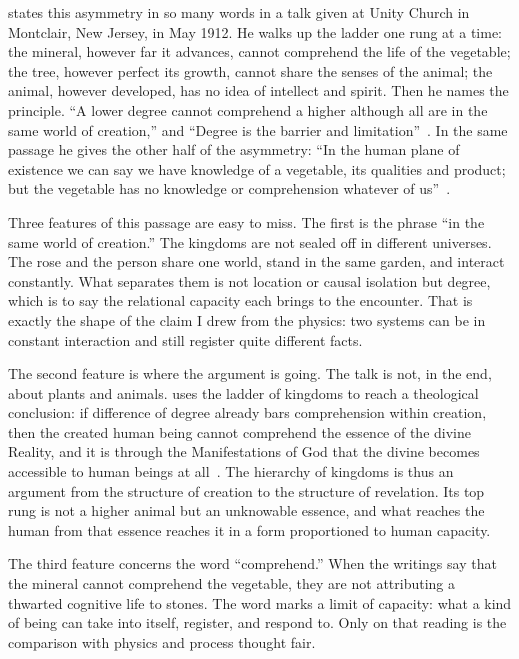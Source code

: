 \AbdulBaha states this asymmetry in so many words in a talk given at Unity Church in Montclair, New Jersey, in May 1912.
He walks up the ladder one rung at a time: the mineral, however far it advances, cannot comprehend the life of the vegetable; the tree, however perfect its growth, cannot share the senses of the animal; the animal, however developed, has no idea of intellect and spirit.
Then he names the principle.
``A lower degree cannot comprehend a higher although all are in the same world of creation,'' and ``Degree is the barrier and limitation''~\citep[Talk 46]{PUP}.
In the same passage he gives the other half of the asymmetry: ``In the human plane of existence we can say we have knowledge of a vegetable, its qualities and product; but the vegetable has no knowledge or comprehension whatever of us''~\citep[Talk 46]{PUP}.

Three features of this passage are easy to miss.
The first is the phrase ``in the same world of creation.''
The kingdoms are not sealed off in different universes.
The rose and the person share one world, stand in the same garden, and interact constantly.
What separates them is not location or causal isolation but degree, which is to say the relational capacity each brings to the encounter.
That is exactly the shape of the claim I drew from the physics: two systems can be in constant interaction and still register quite different facts.

The second feature is where the argument is going.
The talk is not, in the end, about plants and animals.
\AbdulBaha uses the ladder of kingdoms to reach a theological conclusion: if difference of degree already bars comprehension within creation, then the created human being cannot comprehend the essence of the divine Reality, and it is through the Manifestations of God that the divine becomes accessible to human beings at all~\citep[Talk 46]{PUP}.
The hierarchy of kingdoms is thus an argument from the structure of creation to the structure of revelation.
Its top rung is not a higher animal but an unknowable essence, and what reaches the human from that essence reaches it in a form proportioned to human capacity.

The third feature concerns the word ``comprehend.''
When the writings say that the mineral cannot comprehend the vegetable, they are not attributing a thwarted cognitive life to stones.
The word marks a limit of capacity: what a kind of being can take into itself, register, and respond to.
Only on that reading is the comparison with physics and process thought fair.

